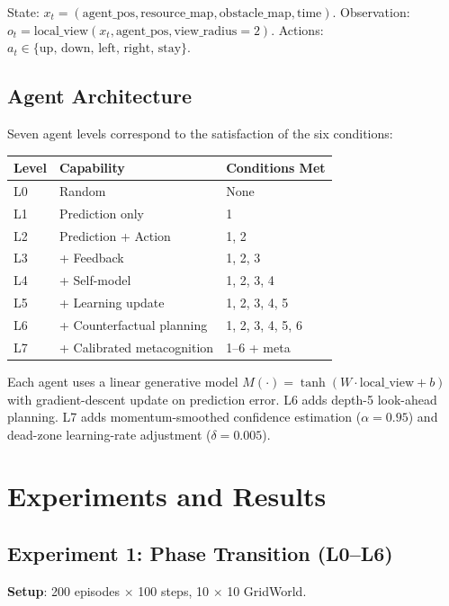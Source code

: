 \documentclass[11pt,a4paper]{article}
\begin{document}
State: $x_t = (\text{agent\_pos}, \text{resource\_map}, \text{obstacle\_map}, \text{time})$.
Observation: $o_t = \text{local\_view}(x_t, \text{agent\_pos}, \text{view\_radius}=2)$.
Actions: $a_t \in \{\text{up, down, left, right, stay}\}$.

\subsection{Agent Architecture}

Seven agent levels correspond to the satisfaction of the six conditions:

\begin{table}[h]
\centering
\begin{tabular}{lll}
\toprule
Level & Capability & Conditions Met \\
\midrule
L0 & Random & None \\
L1 & Prediction only & 1 \\
L2 & Prediction + Action & 1, 2 \\
L3 & + Feedback & 1, 2, 3 \\
L4 & + Self-model & 1, 2, 3, 4 \\
L5 & + Learning update & 1, 2, 3, 4, 5 \\
L6 & + Counterfactual planning & 1, 2, 3, 4, 5, 6 \\
L7 & + Calibrated metacognition & 1--6 + meta \\
\bottomrule
\end{tabular}
\end{table}

Each agent uses a linear generative model $M(\cdot) = \tanh(W \cdot \text{local\_view} + b)$ with gradient-descent update on prediction error. L6 adds depth-5 look-ahead planning. L7 adds momentum-smoothed confidence estimation ($\alpha = 0.95$) and dead-zone learning-rate adjustment ($\delta = 0.005$).

\section{Experiments and Results}

\subsection{Experiment 1: Phase Transition (L0--L6)}

\textbf{Setup}: 200 episodes $\times$ 100 steps, 10 $\times$ 10 GridWorld.
\end{document}
